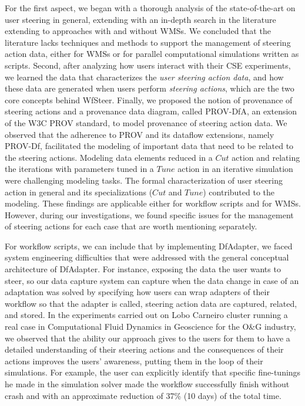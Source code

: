 For the first aspect, we began with a thorough analysis of the state-of-the-art on user steering in general, extending with an in-depth search in the literature extending to approaches with and without WMSs.
We concluded that the literature lacks techniques and methods to support the management of steering action data, either for WMSs or for parallel computational simulations written as scripts.
Second, after analyzing how users interact with their CSE experiments, we learned the data that characterizes the \textit{user steering action data}, and how these data are generated when users perform \textit{steering actions}, which are the two core concepts behind WfSteer.
Finally, we proposed the notion of provenance of steering actions and a provenance data diagram, called PROV-DfA, an extension of the W3C PROV standard, to model provenance of steering action data.
We observed that the adherence to PROV and its dataflow extensions, namely PROV-Df, facilitated the modeling of important data that need to be related to the steering actions. Modeling data elements reduced in a $Cut$ action and relating the iterations with parameters tuned in a $Tune$ action in an iterative simulation were challenging modeling tasks. The formal characterization of user steering action in general and its specializations ($Cut$ and $Tune$) contributed to the modeling.
These findings are applicable either for workflow scripts and for WMSs. However, during our investigations, we found 
specific issues for the management of steering actions for each case that are worth mentioning separately.

For workflow scripts, we can include that by implementing DfAdapter, we faced system engineering difficulties that were addressed with
the general conceptual architecture of DfAdapter.
For instance, exposing the data the user wants to steer, so our
data capture system can capture when the data change in case of an adaptation
was solved by specifying how users can wrap
adapters of their workflow so that the adapter is called, steering action data are
 captured, related, and stored. 
 In the experiments carried out on Lobo Carneiro cluster running a real case in Computational Fluid Dynamics in Geoscience for the O\&G industry, we observed that the ability our approach gives to the users for them to have a detailed understanding of their steering actions and the consequences of their actions improves the users' awareness, putting them in the loop
of their simulations. For example, the user can explicitly
identify that specific fine-tunings he made in the simulation solver
made the workflow successfully finish without crash and
with an approximate reduction of 37\% (10 days) of the total time.

